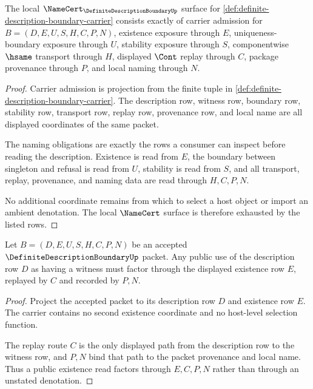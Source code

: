 \begin{theorem}
\label{thm:definite-description-boundary-namecert-obligations}
The local $\NameCert_{\DefiniteDescriptionBoundaryUp}$ surface for \autoref{def:definite-description-boundary-carrier} consists exactly of carrier admission for $B=(D,E,U,S,H,C,P,N)$, existence exposure through $E$, uniqueness-boundary exposure through $U$, stability exposure through $S$, componentwise $\hsame$ transport through $H$, displayed $\Cont$ replay through $C$, package provenance through $P$, and local naming through $N$.
\end{theorem}
\begin{proof}
Carrier admission is projection from the finite tuple in \autoref{def:definite-description-boundary-carrier}. The description row, witness row, boundary row, stability row, transport row, replay row, provenance row, and local name are all displayed coordinates of the same packet.

The naming obligations are exactly the rows a consumer can inspect before reading the description. Existence is read from $E$, the boundary between singleton and refusal is read from $U$, stability is read from $S$, and all transport, replay, provenance, and naming data are read through $H,C,P,N$.

No additional coordinate remains from which to select a host object or import an ambient denotation. The local $\NameCert$ surface is therefore exhausted by the listed rows.
\end{proof}

\begin{theorem}
\label{thm:definite-description-boundary-existence-route}
Let $B=(D,E,U,S,H,C,P,N)$ be an accepted $\DefiniteDescriptionBoundaryUp$ packet. Any public use of the description row $D$ as having a witness must factor through the displayed existence row $E$, replayed by $C$ and recorded by $P,N$.
\end{theorem}
\begin{proof}
Project the accepted packet to its description row $D$ and existence row $E$. The carrier contains no second existence coordinate and no host-level selection function.

The replay route $C$ is the only displayed path from the description row to the witness row, and $P,N$ bind that path to the packet provenance and local name. Thus a public existence read factors through $E,C,P,N$ rather than through an unstated denotation.
\end{proof}


